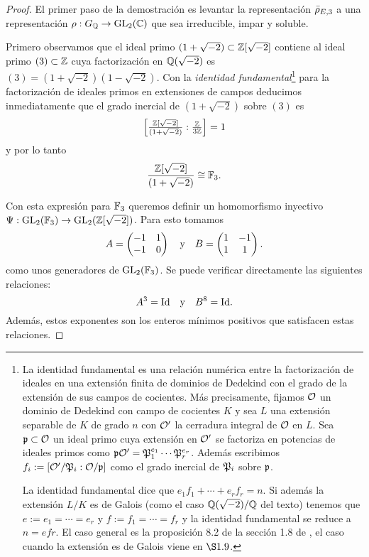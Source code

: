 \begin{proof}
  El primer paso de la demostraci\'on es levantar la representaci\'on $\bar{\rho}_{E,3}$ a una representaci\'on $\rho:G_{\mathbb{Q}}\rightarrow \mathrm{GL}_2(\mathbb{C})$ que sea irreducible, impar y soluble.

  Primero observamos que el ideal primo $(1+\sqrt{-2})\subset\mathbb{Z}[\sqrt{-2}]$ contiene al ideal primo $(3)\subset\mathbb{Z}$ cuya factorizaci\'on en $\mathbb{Q}(\sqrt{-2})$ es $(3)=(1+\sqrt{-2})(1-\sqrt{-2})$. Con la \emph{identidad fundamental}\footnote{La identidad fundamental es una relaci\'on num\'erica entre la factorizaci\'on de ideales en una extensi\'on finita de dominios de Dedekind con el grado de la extensi\'on de sus campos de cocientes. M\'as precisamente, fijamos $\mathcal{O}$ un dominio de Dedekind con campo de cocientes $K$ y sea $L$ una extensi\'on separable de $K$ de grado $n$ con $\mathcal{O}'$ la cerradura integral de $\mathcal{O}$ en $L$. Sea $\mathfrak{p}\subset\mathcal{O}$ un ideal primo cuya extensi\'on en $\mathcal{O}'$ se factoriza en potencias de ideales primos como $\mathfrak{p}\mathcal{O}'=\mathfrak{P}_1^{e_1}\cdots\mathfrak{P}_r^{e_r}$. Adem\'as escribimos $f_i:=[\mathcal{O}'/\mathfrak{P}_i:\mathcal{O}/\mathfrak{p}]$ como el grado inercial de $\mathfrak{P}_i$ sobre $\mathfrak{p}$.

    La identidad fundamental dice que $e_1f_1+\cdots+e_r f_r=n$. Si adem\'as la extensi\'on $L/K$ es de Galois (como el caso $\mathbb{Q}(\sqrt{-2})/\mathbb{Q}$ del texto) tenemos que $e:=e_1=\cdots=e_r$ y $f:=f_1=\cdots=f_r$ y la identidad fundamental se reduce a $n=efr$. El caso general es la proposici\'on 8.2 de la secci\'on 1.8 de \cite{NeukirchANT}, el caso cuando la extensi\'on es de Galois viene en $\S1.9$.} para la factorizaci\'on de ideales primos en extensiones de campos deducimos inmediatamente que el grado inercial de $(1+\sqrt{-2})$ sobre $(3)$ es
  \[
    \left[\tfrac{\mathbb{Z}[\sqrt{-2}]}{(1+\sqrt{-2})}:\tfrac{\mathbb{Z}}{3\mathbb{Z}}\right]=1
  \]
y por lo tanto
  \[
    \frac{\mathbb{Z}[\sqrt{-2}]}{(1+\sqrt{-2})}\cong \mathbb{F}_3.
  \]

  Con esta expresi\'on para $\mathbb{F}_3$ queremos definir un homomorfismo inyectivo $\Psi:\mathrm{GL}_2(\mathbb{F}_3)\rightarrow\mathrm{GL}_2(\mathbb{Z}[\sqrt{-2}])$. Para esto tomamos
  \[
    A=\begin{pmatrix}-1&1\\-1&0\end{pmatrix}\quad \text{y} \quad B=\begin{pmatrix}1 & -1\\ 1 & 1\end{pmatrix}.
  \]
  como unos generadores de $\mathrm{GL}_2(\mathbb{F}_3)$. Se puede verificar directamente las siguientes relaciones:
  \[
    A^3=\mathrm{Id}\quad\text{y}\quad B^8=\mathrm{Id}.
  \]
  Además, estos exponentes son los enteros mínimos positivos que satisfacen estas relaciones.
  

\end{proof}
